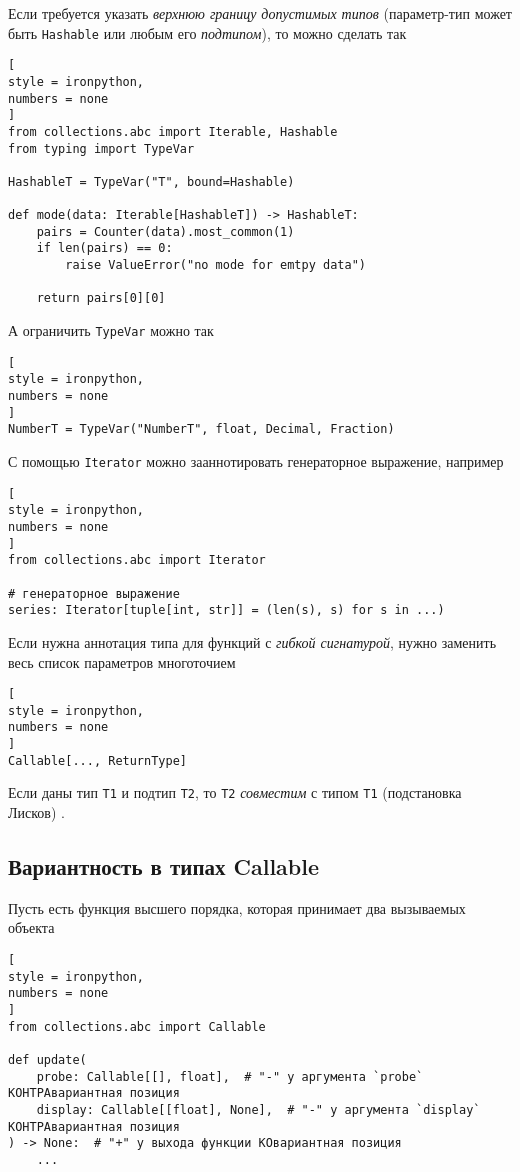 \documentclass[%
	11pt,
	a4paper,
	utf8,
		]{article}
\begin{document}
Если требуется указать \emph{верхнюю границу допустимых типов} (параметр-тип может быть \verb*|Hashable| или любым его \emph{подтипом}), то можно сделать так
\begin{lstlisting}[
style = ironpython,
numbers = none
]
from collections.abc import Iterable, Hashable
from typing import TypeVar

HashableT = TypeVar("T", bound=Hashable)

def mode(data: Iterable[HashableT]) -> HashableT:
    pairs = Counter(data).most_common(1)
    if len(pairs) == 0:
        raise ValueError("no mode for emtpy data")
    
    return pairs[0][0]
\end{lstlisting}

А ограничить \verb*|TypeVar| можно так
\begin{lstlisting}[
style = ironpython,
numbers = none
]
NumberT = TypeVar("NumberT", float, Decimal, Fraction)
\end{lstlisting}

С помощью \verb*|Iterator| можно зааннотировать генераторное выражение, например
\begin{lstlisting}[
style = ironpython,
numbers = none
]
from collections.abc import Iterator

# генераторное выражение
series: Iterator[tuple[int, str]] = (len(s), s) for s in ...)
\end{lstlisting}

Если нужна аннотация типа для функций с \emph{гибкой сигнатурой}, нужно заменить весь список параметров многоточием \cite[]{ramalho:python-2022}
\begin{lstlisting}[
style = ironpython,
numbers = none
]
Callable[..., ReturnType]
\end{lstlisting}

Если даны тип \verb*|T1| и подтип \verb*|T2|, то \verb*|T2| \emph{совместим} с типом \verb*|T1| (подстановка Лисков) \cite[]{ramalho:python-2022}.

\subsection{Вариантность в типах Callable}

Пусть есть функция высшего порядка, которая принимает два вызываемых объекта
\begin{lstlisting}[
style = ironpython,
numbers = none
]
from collections.abc import Callable

def update(
    probe: Callable[[], float],  # "-" у аргумента `probe` КОНТРАвариантная позиция
    display: Callable[[float], None],  # "-" у аргумента `display` КОНТРАвариантная позиция
) -> None:  # "+" у выхода функции КОвариантная позиция
    ...
\end{lstlisting}
\end{document}
